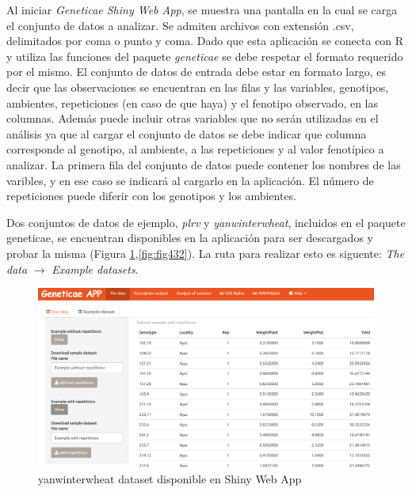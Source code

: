 Al iniciar \emph{Geneticae Shiny Web App}, se muestra una pantalla en la cual se carga el conjunto de datos a analizar. Se admiten archivos con extensión .csv, delimitados por coma o punto y coma.
Dado que esta aplicación se conecta con R y utiliza las funciones del paquete \emph{geneticae} se debe respetar el formato requerido por el mismo. El conjunto de datos de entrada debe estar en formato largo, es decir que las observaciones se encuentran en las filas y las variables, genotipos, ambientes, repeticiones (en caso de que haya) y el fenotipo observado, en las columnas. Además puede incluir otras variables que no serán utilizadas en el análisis ya que al cargar el conjunto de datos se debe indicar que columna corresponde al genotipo, al ambiente, a las repeticiones y al valor fenotípico a analizar. La primera fila del conjunto de datos puede contener los nombres de las varibles, y en ese caso se indicará al cargarlo en la aplicación. El número de repeticiones puede diferir con los genotipos y los ambientes.

Dos conjuntos de datos de ejemplo, \emph{plrv} y \emph{yanwinterwheat}, incluidos en el paquete geneticae, se encuentran disponibles en la aplicación para ser descargados y probar la misma (Figura \ref{fig:fig431},\ref{fig:fig432}). La ruta para realizar esto es siguente: \emph{The data} $\rightarrow$ \emph{Example datasets}.

 \begin{figure}[H]
	\begin{center}
		\includegraphics[width=16cm]{./Graficos/Exampledatasets_withoutrep.png}
	\end{center}
	\caption{yanwinterwheat dataset disponible en Shiny Web App}
	\label{fig:fig431}
\end{figure}

